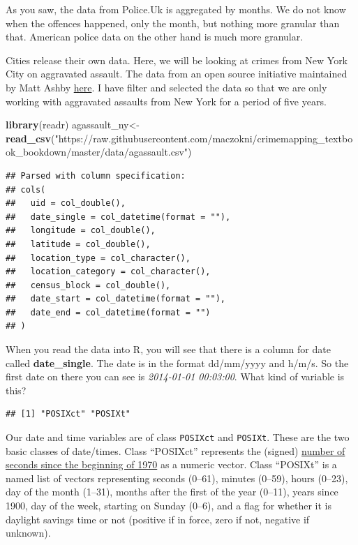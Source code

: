 \documentclass[]{book}
\newenvironment{Shaded}{\begin{snugshade}}{\end{snugshade}}
\newcommand{\KeywordTok}[1]{\textcolor[rgb]{0.13,0.29,0.53}{\textbf{#1}}}
\newcommand{\NormalTok}[1]{#1}
\newcommand{\OperatorTok}[1]{\textcolor[rgb]{0.81,0.36,0.00}{\textbf{#1}}}
\newcommand{\StringTok}[1]{\textcolor[rgb]{0.31,0.60,0.02}{#1}}
\begin{document}
As you saw, the data from Police.Uk is aggregated by months. We do not know when the offences happened, only the month, but nothing more granular than that. American police data on the other hand is much more granular.

Cities release their own data. Here, we will be looking at crimes from New York City on aggravated assault. The data from an open source initiative maintained by Matt Ashby \href{https://osf.io/zyaqn/}{here}. I have filter and selected the data so that we are only working with aggravated assaults from New York for a period of five years.

\begin{Shaded}
\begin{Highlighting}[]
\KeywordTok{library}\NormalTok{(readr)}
\NormalTok{agassault_ny<-}\KeywordTok{read_csv}\NormalTok{(}\StringTok{"https://raw.githubusercontent.com/maczokni/crimemapping_textbook_bookdown/master/data/agassault.csv"}\NormalTok{)}
\end{Highlighting}
\end{Shaded}

\begin{verbatim}
## Parsed with column specification:
## cols(
##   uid = col_double(),
##   date_single = col_datetime(format = ""),
##   longitude = col_double(),
##   latitude = col_double(),
##   location_type = col_character(),
##   location_category = col_character(),
##   census_block = col_double(),
##   date_start = col_datetime(format = ""),
##   date_end = col_datetime(format = "")
## )
\end{verbatim}

When you read the data into R, you will see that there is a column for date called \textbf{date\_single}. The date is in the format dd/mm/yyyy and h/m/s. So the first date on there you can see is \emph{2014-01-01 00:03:00}. What kind of variable is this?

\begin{Shaded}
\end{Shaded}

\begin{verbatim}
## [1] "POSIXct" "POSIXt"
\end{verbatim}

Our date and time variables are of class \texttt{POSIXct} and \texttt{POSIXt}. These are the two basic classes of date/times. Class ``POSIXct'' represents the (signed) \href{https://en.wikipedia.org/wiki/Unix_time}{number of seconds since the beginning of 1970} as a numeric vector. Class ``POSIXt'' is a named list of vectors representing seconds (0--61), minutes (0--59), hours (0--23), day of the month (1--31), months after the first of the year (0--11), years since 1900, day of the week, starting on Sunday (0--6), and a flag for whether it is daylight savings time or not (positive if in force, zero if not, negative if unknown).
\end{document}
